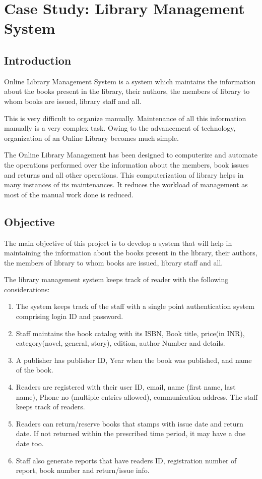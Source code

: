 \section{Case Study: Library Management System}

\subsection{Introduction}

Online Library Management System is a system which
maintains the information about the books present in the
library, their authors, the members of library to whom
books are issued, library staff and all.

This is very difficult to organize manually.
Maintenance of all this information
manually is a very complex task.
Owing to the advancement of technology, organization of an Online Library becomes much simple.

The Online Library Management has been designed to computerize and
automate the operations performed over the information
about the members, book issues and returns and all other
operations. This computerization of library helps in many
instances of its maintenances. It reduces the workload of
management as most of the manual work done is reduced.

\subsection{Objective}

The main objective of this project is to develop a system that
will help in maintaining the information about the books present in the library, their authors, the members of library to whom books are issued, library staff and all.

The library management system keeps track of reader with the following considerations:

\begin{enumerate}
    \item The system keeps track of the staff with a single point
          authentication system comprising login ID and password.
    \item Staff maintains the book catalog with its ISBN, Book title, price(in INR), category(novel, general, story), edition, author
          Number and details.
    \item A publisher has publisher ID, Year when the book was
          published, and name of the book.
    \item Readers are registered with their user ID, email,
          name (first name, last name), Phone no (multiple entries allowed), communication address. The staff keeps track of readers.

    \item Readers can return/reserve books that stamps with issue
          date and return date. If not returned within the prescribed time period, it may have a due date too.
    \item Staff also generate reports that have readers ID, registration number of report, book number and return/issue info.
\end{enumerate}

